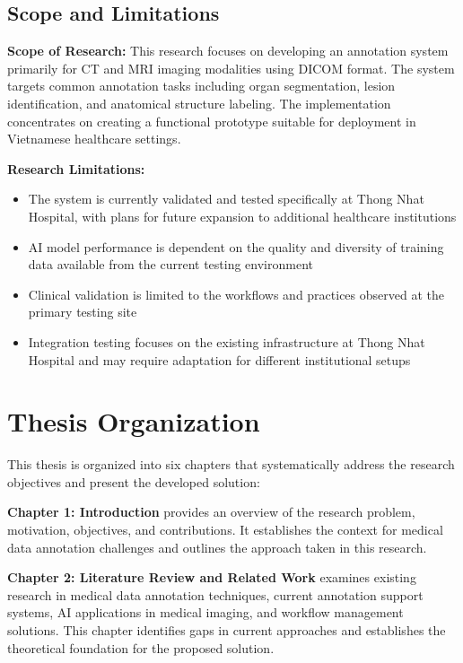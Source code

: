 \subsection{Scope and Limitations}

\textbf{Scope of Research:}
This research focuses on developing an annotation system primarily for CT and MRI imaging modalities using DICOM format. The system targets common annotation tasks including organ segmentation, lesion identification, and anatomical structure labeling. The implementation concentrates on creating a functional prototype suitable for deployment in Vietnamese healthcare settings.

\textbf{Research Limitations:}
\begin{itemize}
    \item The system is currently validated and tested specifically at Thong Nhat Hospital, with plans for future expansion to additional healthcare institutions
    \item AI model performance is dependent on the quality and diversity of training data available from the current testing environment
    \item Clinical validation is limited to the workflows and practices observed at the primary testing site
    \item Integration testing focuses on the existing infrastructure at Thong Nhat Hospital and may require adaptation for different institutional setups
\end{itemize}

\section{Thesis Organization}

This thesis is organized into six chapters that systematically address the research objectives and present the developed solution:

\textbf{Chapter 1: Introduction} provides an overview of the research problem, motivation, objectives, and contributions. It establishes the context for medical data annotation challenges and outlines the approach taken in this research.

\textbf{Chapter 2: Literature Review and Related Work} examines existing research in medical data annotation techniques, current annotation support systems, AI applications in medical imaging, and workflow management solutions. This chapter identifies gaps in current approaches and establishes the theoretical foundation for the proposed solution.

